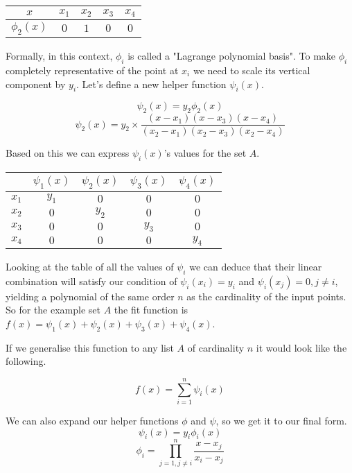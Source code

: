 \documentclass[12pt, titlepage]{article}
\begin{document}
{
\centering
\begin{tabular}{c|c c c c}
    $x$ & $x_1$ & $x_2$ & $x_3$ & $x_4$ \\
    \hline
    $\phi_2(x)$ & $0$ & $1$ & $0$ & $0$ \\
\end{tabular}\par
}

Formally, in this context, $\phi_i$ is called a "Lagrange polynomial basis".
To make $\phi_i$ completely representative of the point at $x_i$ we need to 
scale its vertical component by $y_i$. Let's define a new helper 
function $\psi_i(x)$.

\begin{equation}
    \psi_2(x) = y_2 \phi_2(x)
\end{equation}
\begin{equation}
    \psi_2(x) = y_2 \times \frac{(x - x_1)(x - x_3)(x - x_4)}{(x_2 - x_1)(x_2 - x_3)(x_2 - x_4)}
\end{equation}

Based on this we can express $\psi_i(x)$'s values for the set $A$.

{
\centering
\begin{tabular}{c|c c c c}
    & $\psi_1(x) $ & $\psi_2(x)$ & $\psi_3(x)$ & $\psi_4(x)$ \\
    \hline
    $x_1$ & $y_1$ & $0$ & $0$ & $0$ \\
    $x_2$ & $0$ & $y_2$ & $0$ & $0$ \\
    $x_3$ & $0$ & $0$ & $y_3$ & $0$ \\
    $x_4$ & $0$ & $0$ & $0$ & $y_4$ \\
\end{tabular}\par
}

Looking at the table of all the values of $\psi_i$ we can deduce that their linear
combination will satisfy our condition of $\psi_i(x_i) = y_i$ and 
$\psi_i(x_j) = 0, j \neq i$, yielding a polynomial of the same order $n$
as the cardinality of the input points.
So for the example set $A$ the fit function is 
$f(x) = \psi_1(x) + \psi_2(x) + \psi_3(x) + \psi_4(x)$.

If we generalise this function to any list $A$ of cardinality $n$ it would look
like the following.

\begin{equation}
    f(x) = \sum_{i=1}^{n}\psi_i(x)
\end{equation}

We can also expand our helper functions $\phi$ and $\psi$, so we get it to our 
final form.
$$\psi_i(x) = y_i \phi_i(x)$$
\begin{equation}
    \phi_i = \prod_{j=1, j \neq i}^{n}\frac{x - x_j}{x_i - x_j}
\end{equation}
\end{document}
